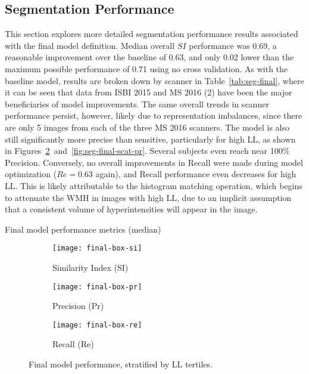 \subsection{Segmentation Performance}\label{ss:exp-finalseg}
This section explores more detailed segmentation performance results
associated with the final model definition.
Median overall $SI$ performance was 0.69, a reasonable improvement over the baseline of 0.63,
and only 0.02 lower than the maximum possible performance of 0.71 using no cross validation.
As with the baseline model, results are broken down by scanner in Table~\ref{tab:seg-final},
where it can be seen that data from ISBI 2015 and MS 2016 (2)
have been the major beneficiaries of model improvements.
The same overall trends in scanner performance persist, however,
likely due to representation imbalances,
since there are only 5 images from each of the three MS 2016 scanners.
The model is also still significantly more precise than sensitive,
particularly for high LL, as shown in
Figures~\ref{fig:seg-final-pr}~and~\ref{fig:seg-final-scat-pr}.
Several subjects even reach near 100\% Precision.
Conversely, no overall improvements in Recall
were made during model optimization ($Re = 0.63$ again),
and Recall performance even decreases for high LL.
This is likely attributable to the histogram matching operation,
which begins to attenuate the WMH in images with high LL,
due to an implicit assumption that a consistent volume of hyperintensities will 
appear in the image.
\par
\begin{table}
  \centering
  \caption{Final model performance metrics (median)}%
  \label{tab:seg-final}
  
\end{table}
\begin{figure}
  \centering
  \begin{subfigure}{0.32\textwidth}
    \centering
    \texttt{[image: final-box-si]}
    \caption{Similarity Index (SI)}%
    \label{fig:seg-final-si}
  \end{subfigure}
  \begin{subfigure}{0.32\textwidth}
    \centering
    \texttt{[image: final-box-pr]}
    \caption{Precision (Pr)}%
    \label{fig:seg-final-pr}
  \end{subfigure}
  \begin{subfigure}{0.32\textwidth}
    \centering
    \texttt{[image: final-box-re]}
    \caption{Recall (Re)}%
    \label{fig:seg-final-re}
  \end{subfigure}
  \caption{Final model performance, stratified by LL tertiles.}%
  \label{fig:seg-final}
\end{figure}
